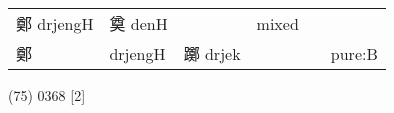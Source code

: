 \documentclass[14pt,a4paper]{scrartcl}
\begin{document}
\begin{longtable}[c]{@{}llllll@{}}
\begin{minipage}[t]{0.14\columnwidth}
鄭 drjengH
\strut\end{minipage} &
\begin{minipage}[t]{0.14\columnwidth}\raggedright\strut
奠 denH
\strut\end{minipage} &
\begin{minipage}[t]{0.14\columnwidth}\raggedright\strut
\strut\end{minipage} &
\begin{minipage}[t]{0.14\columnwidth}\raggedright\strut
mixed
\strut\end{minipage}\tabularnewline
\begin{minipage}[t]{0.14\columnwidth}\raggedright\strut
鄭
\strut\end{minipage} &
\begin{minipage}[t]{0.14\columnwidth}\raggedright\strut
drjengH
\strut\end{minipage} &
\begin{minipage}[t]{0.14\columnwidth}\raggedright\strut
躑 drjek
\strut\end{minipage} &
\begin{minipage}[t]{0.14\columnwidth}\raggedright\strut
\strut\end{minipage} &
\begin{minipage}[t]{0.14\columnwidth}\raggedright\strut
\strut\end{minipage} &
\begin{minipage}[t]{0.14\columnwidth}\raggedright\strut
pure:B
\strut\end{minipage}\tabularnewline
\bottomrule
\end{longtable}

(75) 0368 {[}2{]}
\end{document}
